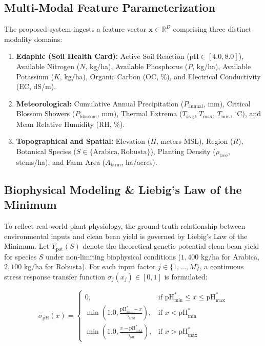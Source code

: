 \documentclass[conference]{IEEEtran}
\begin{document}
\subsection{Multi-Modal Feature Parameterization}
The proposed system ingests a feature vector $\mathbf{x} \in \mathbb{R}^{D}$ comprising three distinct modality domains:
\begin{enumerate}
    \item \textbf{Edaphic (Soil Health Card):} Active Soil Reaction ($\text{pH} \in [4.0, 8.0]$), Available Nitrogen ($N$, kg/ha), Available Phosphorus ($P$, kg/ha), Available Potassium ($K$, kg/ha), Organic Carbon ($\text{OC}$, \%), and Electrical Conductivity ($\text{EC}$, dS/m).
    \item \textbf{Meteorological:} Cumulative Annual Precipitation ($P_{\text{annual}}$, mm), Critical Blossom Showers ($P_{\text{blossom}}$, mm), Thermal Extrema ($T_{\text{avg}}$, $T_{\text{max}}$, $T_{\text{min}}$, $^\circ\text{C}$), and Mean Relative Humidity ($\text{RH}$, \%).
    \item \textbf{Topographical and Spatial:} Elevation ($H$, meters MSL), Region ($R$), Botanical Species ($S \in \{\text{Arabica}, \text{Robusta}\}$), Planting Density ($\rho_{\text{tree}}$, stems/ha), and Farm Area ($A_{\text{farm}}$, ha/acres).
\end{enumerate}

\subsection{Biophysical Modeling \& Liebig's Law of the Minimum}
To reflect real-world plant physiology, the ground-truth relationship between environmental inputs and clean bean yield is governed by Liebig's Law of the Minimum. Let $Y_{\text{pot}}(S)$ denote the theoretical genetic potential clean bean yield for species $S$ under non-limiting biophysical conditions ($1,400\text{ kg/ha}$ for Arabica, $2,100\text{ kg/ha}$ for Robusta). For each input factor $j \in \{1, \dots, M\}$, a continuous stress response transfer function $\sigma_j(x_j) \in [0, 1]$ is formulated:

\begin{equation}
\sigma_{\text{pH}}(x) = \begin{cases} 
0, & \text{if } \text{pH}_{\text{min}}^* \le x \le \text{pH}_{\text{max}}^* \\
\min\left(1.0, \frac{\text{pH}_{\text{min}}^* - x}{\gamma_{\text{acid}}}\right), & \text{if } x < \text{pH}_{\text{min}}^* \\
\min\left(1.0, \frac{x - \text{pH}_{\text{max}}^*}{\gamma_{\text{alk}}}\right), & \text{if } x > \text{pH}_{\text{max}}^*
\end{cases}
\end{equation}
\end{document}
